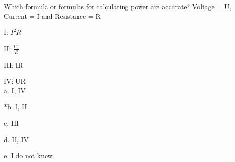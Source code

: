 
Which formula or formulas for calculating power are accurate? Voltage = U, Current = I and Resistance = R 

I: \( I^{2}R \)

II: \( \frac{U^{2}}{R} \)

III: IR

IV: UR \\

a. I, IV

*b. I, II

c. III

d. II, IV

e. I do not know \\
